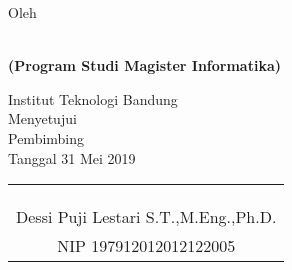 \clearpage
\pagestyle{empty}

\begin{center}
\smallskip

    \singlespacing
    \large \bfseries \MakeUppercase{\thetitle}
    \vfill

    \normalsize \normalfont Oleh

    \bfseries \large \theauthor\\
    \normalsize (Program Studi Magister Informatika)

    \normalsize \normalfont Institut Teknologi Bandung \\

    \vfill
    \normalsize \normalfont
    Menyetujui\\
    Pembimbing\\
    \bigskip
    Tanggal 31 Mei 2019

    \setlength{\tabcolsep}{12pt}
    \begin{tabular}{c}
        \\
        \\
        \\
        \\
        Dessi Puji Lestari S.T.,M.Eng.,Ph.D. \\
        NIP 197912012012122005 \\
    \end{tabular}

\end{center}
\clearpage

